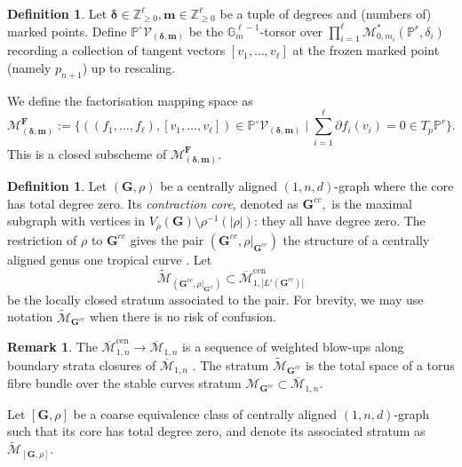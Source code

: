 \documentclass[12pt,reqno]{amsart}
\theoremstyle{definition}
\theoremstyle{definition}
\theoremstyle{definition}
\theoremstyle{definition}
\newtheorem{remark}[theorem]{Remark}
\newtheorem{definition}[theorem]{Definition}
\newcommand{\ol}[1]{\overline{#1}}
\newcommand{\PP}{\mathbb{P}}
\newcommand{\Mcal}{\mathcal{M}}
\newcommand{\Mbar}{\ol{\Mcal}}
\newcommand{\M}{\mathcal{M}}
\newcommand{\Mtil}{\widetilde{\mathcal{M}}}
\begin{document}
\begin{definition}
  Let $\boldsymbol{\delta}\in \mathbb{Z}_{\geq 0}^\ell,\boldsymbol{m}\in \mathbb{Z}_{\geq 0}^\ell$ be a tuple of degrees and (numbers of) marked points. Define $\mathbb{P}^{\circ}\mathcal{V}_{(\boldsymbol{\delta}, \boldsymbol{m})}$ be the $\mathbb{G}_m^{\ell-1}$-torsor over $\prod_{i=1}^\ell \M_{0,m_i}^*(\PP^r,\delta_i)$ recording a collection of tangent vectors $[v_1,\dots, v_\ell]$ at the frozen marked point (namely $p_{n+1}$) up to rescaling.
  
  We define the factorisation mapping space as \[\mathcal{M}^{\mathbf{F}}_{(\boldsymbol{\delta}, \boldsymbol{m})}:=\{((f_1,\dots,f_\ell), [v_1,\dots, v_\ell])\in \mathbb{P}^{\circ}\mathcal{V}_{(\boldsymbol{\delta}, \boldsymbol{m})}\mid \sum_{i=1}^\ell \partial f_i(v_i) = 0\in T_p\PP^r\}.\] This is a closed subscheme of $\mathcal{M}^{\mathbf{F}}_{(\boldsymbol{\delta}, \boldsymbol{m})}.$
\end{definition}

\begin{definition}
  Let $(\mathbf{G}, \rho)$ be a centrally aligned $(1,n,d)$-graph where the core has total degree zero. Its \emph{contraction core}, denoted as $\mathbf{G}^{cc},$ is the maximal subgraph with vertices in $V_\rho(\mathbf{G})\setminus \rho^{-1}(|\rho|)$: they all have degree zero. The restriction of $\rho$ to $\mathbf{G}^{cc}$ gives the pair $(\mathbf{G}^{cc}, \rho|_{\mathbf{G}^{cc}})$ the structure of a centrally aligned genus one tropical curve \cite[§3.3]{rspw}. Let $$\Mtil_{(\mathbf{G}^{cc}, \rho|_{\mathbf{G}^{cc}})}\subset \Mbar_{1,|L'(\mathbf{G}^{cc})|}^{\mathrm{cen}}$$ be the locally closed stratum associated to the pair. For brevity, we may use notation $\Mtil_{\mathbf{G}^{cc}}$ when there is no risk of confusion.
\end{definition}

\begin{remark}
  The $\Mbar_{1,n}^{\mathrm{cen}}\to \Mbar_{1,n}$ is a sequence of weighted blow-ups along boundary strata closures of $\Mbar_{1,n}$ \cite[Prop 3.3.4]{rspw}. The stratum $\Mtil_{\mathbf{G}^{cc}}$ is the total space of a torus fibre bundle over the stable curves stratum $\M_{\mathbf{G}^{cc}}\subset \Mbar_{1,n}.$
\end{remark}


  Let $[\mathbf{G}, \rho]$ be a coarse equivalence class of centrally aligned $(1,n,d)$-graph such that its core has total degree zero, and denote its associated stratum as $\Mtil_{[\mathbf{G}, \rho]}.$
  
\end{document}
